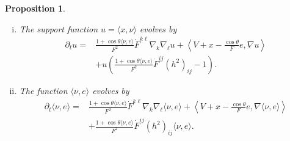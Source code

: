 \documentclass[11pt,reqno]{amsart}
\newtheorem{prop}[thm]{Proposition}
\theoremstyle{definition}
\theoremstyle{remark}
\numberwithin{equation}{section}
\renewcommand{\(}{\left(}
\renewcommand{\)}{\right)}
\renewcommand{\-}{\overline}
\renewcommand{\t}{\theta}
\begin{document}
\begin{prop}
\begin{enumerate}[(i)]
		\begin{align}\label{s3:evol-mean-curvature}
		\partial_t H=&\frac{1+\cos\t\langle \nu,e\rangle}{F^2}\dot{F}^{k\ell}\nabla_k \nabla_\ell H+\left\langle V+x-\frac{\cos\t}{F}e,\nabla H\right\rangle\nonumber\\
		&+\frac{1+\cos\t\langle \nu,e\rangle}{F^2}\ddot{F}^{k\ell,pq}\nabla_i h_{k\ell}\nabla_i h_{pq}\nonumber\\
&-\frac{2(1+\cos\t\langle \nu,e\rangle)}{F^3}|\nabla F|^2+\frac{2\cos\t}{F^2}\langle \nabla F,\nabla \langle \nu,e\rangle\rangle \nonumber\\
		&+\(\frac{1+\cos\t\langle \nu,e\rangle}{F^2}\dot{F}^{k\ell}(h^2)_{k\ell}+1\)H\nonumber\\
&-\frac{2+\cos\t\langle \nu,e\rangle}{F}|A|^2 .
		\end{align}
		If $\Sigma_t$ is a strictly convex solution to the flow \eqref{s2:BGL-flow}, then
		\begin{align}\label{s3:bdry-H}
		\nabla_\mu H\leq 0, \quad \text{on $\partial \Sigma_t$}.
		\end{align}
\item The support function $u=\langle x,\nu\rangle$ evolves by
\begin{align}\label{s3.evl-u}
  \partial_tu= & \frac{1+\cos\t\langle \nu,e\rangle}{F^2}\dot{F}^{k\ell}\nabla_k \nabla_\ell u +\left\langle V+x-\frac{\cos\t}{F}e,\nabla u\right\rangle\nonumber\\
  & +u\left(\frac{1+\cos\t\langle \nu,e\rangle}{F^2}\dot{F}^{ij}(h^2)_{ij}-1\right).
\end{align}
\item The function $\langle \nu,e\rangle $ evolves by
\begin{align}\label{s3.evl-nue}
  \partial_t\langle \nu,e\rangle = & \frac{1+\cos\t\langle \nu,e\rangle}{F^2}\dot{F}^{k\ell}\nabla_k \nabla_\ell \langle \nu,e\rangle  +\left\langle V+x-\frac{\cos\t}{F}e,\nabla \langle \nu,e\rangle \right\rangle\nonumber\\
  & +\frac{1+\cos\t\langle \nu,e\rangle}{F^2}\dot{F}^{ij}(h^2)_{ij}\langle \nu,e\rangle .
\end{align}
	\end{enumerate}
\end{prop}
\end{document}
